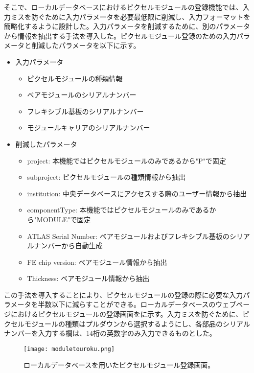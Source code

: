 そこで、ローカルデータベースにおけるピクセルモジュールの登録機能では、入力ミスを防ぐために入力パラメータを必要最低限に削減し、入力フォーマットを簡略化するように設計した。入力パラメータを削減するために、別のパラメータから情報を抽出する手法を導入した。ピクセルモジュール登録のための入力パラメータと削減したパラメータを以下に示す。
\begin{itemize}
  \item 入力パラメータ
  \begin{itemize}
    \item ピクセルモジュールの種類情報
    \item ベアモジュールのシリアルナンバー
    \item フレキシブル基板のシリアルナンバー
    \item モジュールキャリアのシリアルナンバー
  \end{itemize}
  \item 削減したパラメータ
  \begin{itemize}
  \item project: 本機能ではピクセルモジュールのみであるから"P"で固定
  \item subproject: ピクセルモジュールの種類情報から抽出
  \item institution: 中央データベースにアクセスする際のユーザー情報から抽出
  \item componentType: 本機能ではピクセルモジュールのみであるから"MODULE"で固定
  \item ATLAS Serial Number: ベアモジュールおよびフレキシブル基板のシリアルナンバーから自動生成
  \item FE chip version: ベアモジュール情報から抽出
  \item Thickness: ベアモジュール情報から抽出
  \end{itemize}
\end{itemize}

この手法を導入することにより、ピクセルモジュールの登録の際に必要な入力パラメータを半数以下に減らすことができる。ローカルデータベースのウェブページにおけるピクセルモジュールの登録画面をに示す。入力ミスを防ぐために、ピクセルモジュールの種類はプルダウンから選択するようにし、各部品のシリアルナンバーを入力する欄は、14桁の英数字のみ入力できるものとした。

\begin{figure}[tbp]
  \centering
  \texttt{[image: moduletouroku.png]}
  \caption[ローカルデータベースを用いたピクセルモジュール登録画面]{ローカルデータベースを用いたピクセルモジュール登録画面。}
  \label{fig:module-touroku-gamen}
\end{figure}

